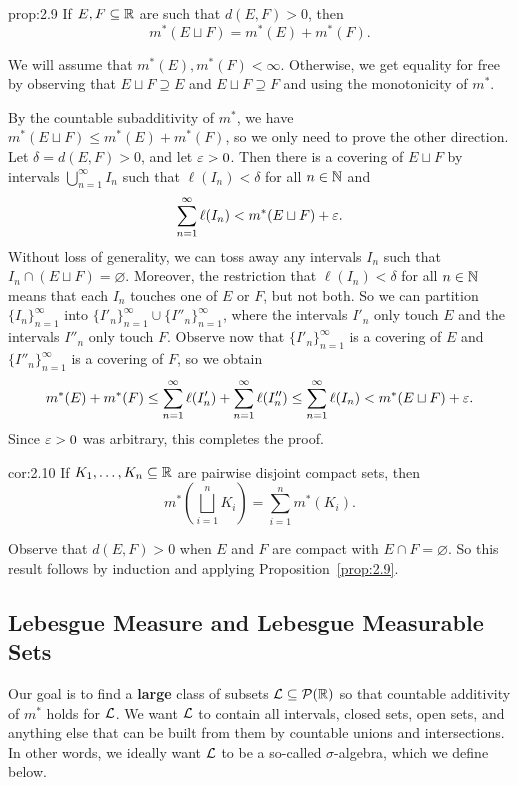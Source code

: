 \begin{prop}{prop:2.9}
    If $E, F \subseteq \mathbb{R}$ are such that $d(E, F) > 0$, then 
    \[ m^*(E \sqcup F) = m^*(E) + m^*(F). \] 
\end{prop}
\begin{pf}
    We will assume that $m^*(E), m^*(F) < \infty$. Otherwise, we get equality 
    for free by observing that $E \sqcup F \supseteq E$ and $E \sqcup F 
    \supseteq F$ and using the monotonicity of $m^*$. 
    
    By the countable subadditivity of $m^*$, we have $m^*(E \sqcup F) \leq 
    m^*(E) + m^*(F)$, so we only need to prove the other direction. 
    Let $\delta = d(E, F) > 0$, and let $\varepsilon > 0$. Then there is a 
    covering of $E \sqcup F$ by intervals $\bigcup_{n=1}^\infty I_n$ 
    such that $\ell(I_n) < \delta$ for all $n \in \mathbb{N}$ and 
    \[ \sum_{n=1}^\infty \ell(I_n) < m^*(E \sqcup F) + \varepsilon. \] 
    Without loss of generality, we can toss away any intervals $I_n$ 
    such that $I_n \cap (E \sqcup F) = \varnothing$. Moreover, the 
    restriction that $\ell(I_n) < \delta$ for all $n \in \mathbb{N}$ means that 
    each $I_n$ touches one of $E$ or $F$, but not both. So we can 
    partition $\{I_n\}_{n=1}^\infty$ into $\{I'_n\}_{n=1}^\infty 
    \cup \{I''_n\}_{n=1}^\infty$, where the intervals $I'_n$ only touch 
    $E$ and the intervals $I''_n$ only touch $F$. Observe now that 
    $\{I'_n\}_{n=1}^\infty$ is a covering of $E$ and 
    $\{I''_n\}_{n=1}^\infty$ is a covering of $F$, so we obtain 
    \[ m^*(E) + m^*(F) \leq \sum_{n=1}^\infty \ell(I'_n) + \sum_{n=1}^\infty 
    \ell(I''_n) \leq \sum_{n=1}^\infty \ell(I_n) < m^*(E \sqcup F) + \varepsilon. \] 
    Since $\varepsilon > 0$ was arbitrary, this completes the proof. 
\end{pf}

\begin{cor}{cor:2.10}
    If $K_1, \dots, K_n \subseteq \mathbb{R}$ are pairwise disjoint compact sets, then 
    \[ m^*\!\left( \bigsqcup_{i=1}^n K_i \right) = \sum_{i=1}^n m^*(K_i). \] 
\end{cor}
\begin{pf}
    Observe that $d(E, F) > 0$ when $E$ and $F$ are compact with $E \cap F 
    = \varnothing$. So this result follows by induction and applying 
    Proposition~\ref{prop:2.9}. 
\end{pf}

\subsection{Lebesgue Measure and Lebesgue Measurable Sets}\label{subsec:2.3}
Our goal is to find a {\bf large} class of subsets ${\cal L} \subseteq 
{\cal P}(\mathbb{R})$ so that countable additivity of $m^*$ holds for ${\cal L}$. 
We want ${\cal L}$ to contain all intervals, closed sets, open sets, and 
anything else that can be built from them by countable unions and intersections. 
In other words, we ideally want ${\cal L}$ to be a so-called $\sigma$-algebra, 
which we define below.

